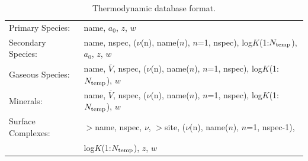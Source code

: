 \begin{table}[h]\centering
\caption{Thermodynamic database format.}\label{tdatabase}
\vspace{3mm}
\begin{tabular}{ll}
\hline
Primary Species: & name, $a_0$, $z$, $w$\\
Secondary Species: & name, nspec, ($\nu$(n), name($n$), $n$=1, nspec), log$K$(1:$N_{\rm temp}$), $a_0$, $z$, $w$\\
Gaseous Species: & name, $\overline V$, nspec, ($\nu$(n), name($n$), $n$=1, nspec), log$K$(1:$N_{\rm temp}$), $w$ \\
Minerals: & name, $\overline V$, nspec, ($\nu$(n), name($n$), $n$=1, nspec), log$K$(1:$N_{\rm temp}$), $w$\\
Surface Complexes: & $>$name, nspec, $\nu$, $>$site, 
($\nu$(n), name($n$), $n$=1, nspec-1), \\
&\hspace{3in} log$K$(1:$N_{\rm temp}$), $z$, $w$\\
\hline
\end{tabular}
\end{table}

